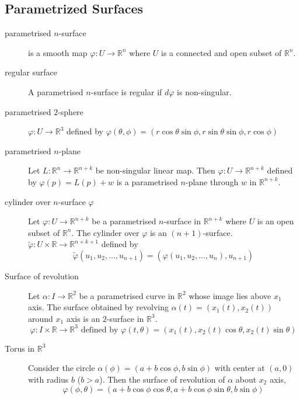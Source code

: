 \subsection{Parametrized Surfaces}
\begin{description}
	\item[parametrised $n$-surface] is a smooth map $\varphi : U \to \mathbb{R}^n$ where $U$ is a connected and open subset of $\mathbb{R}^n$.
	\item[regular surface] A parametrised $n$-surface is regular if $d\varphi$ is non-singular.
	\item[parametrised $2$-sphere] $\varphi : U \to \mathbb{R}^3$ defined by $\varphi(\theta,\phi) = (r\cos \theta \sin \phi,r \sin \theta \sin \phi,r\cos \phi)$
	\item[parametrised $n$-plane] Let $L : \mathbb{R}^n \to \mathbb{R}^{n+k}$ be non-singular linear map.
		Then $\varphi : U \to \mathbb{R}^{n+k}$ defined by $\varphi(p) = L(p) + w$ is a parametrised $n$-plane through $w$ in $\mathbb{R}^{n+k}$.
	\item[cylinder over $n$-surface $\varphi$] Let $\varphi : U \to \mathbb{R}^{n+k}$ be a parametrised $n$-surface in $\mathbb{R}^{n+k}$ where $U$ is an open subset of $\mathbb{R}^n$.
		The cylinder over $\varphi$ is an $(n+1)$-surface.
		$\tilde{\varphi} : U \times \mathbb{R} \to \mathbb{R}^{n+k+1}$ defined by 
	\begin{equation}
		\tilde{\varphi}(u_1,u_2,\dots,u_{n+1}) = (\varphi(u_1,u_2,\dots,u_n),u_{n+1})
	\end{equation}
\item[Surface of revolution] Let $\alpha : I \to \mathbb{R}^2$ be a parametrised curve in $\mathbb{R}^2$ whose image lies above $x_1$ axis.
	The surface obtained by revolving $\alpha(t)=(x_1(t),x_2(t))$ around $x_1$ axis is an $2$-surface in $\mathbb{R}^3$.
	\begin{equation}
		\varphi : I \times \mathbb{R} \to \mathbb{R}^3 \text{ defined by } \varphi(t,\theta) = \left( x_1(t),x_2(t)\cos \theta, x_2(t)\sin \theta \right)
	\end{equation}
\item[Torus in $\mathbb{R}^3$] Consider the circle $\alpha(\phi) = (a+b\cos \phi,b\sin \phi)$ with center at $(a,0)$ with radius $b$ ($b>a$).
	Then the surface of revolution of $\alpha$ about $x_2$ axis, 
	\begin{equation}
		\varphi(\phi,\theta) = (a+b\cos \phi \cos \theta,a+b\cos \phi \sin \theta,b\sin \phi)
	\end{equation}

\end{description}
